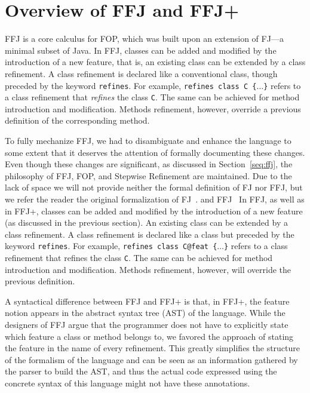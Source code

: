 \chapter{Overview of \gls{FFJ} and \gls{FFJ+}}\label{seq:offj}

\gls{FFJ} is a core calculus for \gls{FOP}, which was built 
upon an extension of \gls{FJ}---a minimal subset of Java. 
In \gls{FFJ}, classes can be added and modified by the 
introduction of a new feature, that is, 
an existing class can be extended by a class refinement. 
A class refinement is declared like a conventional class, though 
preceded by the keyword \texttt{refines}. For example, 
\texttt{refines class C \{$\dots$\}} refers to a class
refinement that
\emph{refines} the class \texttt{C}. The same can be achieved 
for method introduction and modification. Methods refinement,
however, override a previous definition of the corresponding 
method.
 
To fully mechanize \gls{FFJ}, we had to disambiguate and enhance 
the language to some extent that it  deserves the attention of 
formally documenting these changes. 
Even though these changes are significant, as discussed in Section~\ref{seq:ffj}, 
the philosophy of \gls{FFJ}, \gls{FOP}, and Stepwise Refinement are maintained.
Due to the lack of space we will not provide neither the formal definition 
of \gls{FJ} nor \gls{FFJ}, but we refer the reader the original formalization of \gls{FJ}~\cite{igarashi_featherweight_2001}.
 and \gls{FFJ}~\cite{apel_feature_2008}
In \gls{FFJ}, as well as in \gls{FFJ+}, classes can be added and 
modified by the introduction of a new feature (as discussed in the previous section).
An existing class can be extended by a class refinement. A class refinement is declared like a class but
preceded by the keyword \texttt{refines}. For example, \texttt{refines class C@feat \{$\dots$\}} refers to a class refinement that
refines the class \texttt{C}. The same can be achieved for method introduction and modification. Methods refinement,
however, will override the previous definition.

A syntactical difference between \gls{FFJ} and \gls{FFJ+} is that, in \gls{FFJ+}, 
the feature notion appears in the abstract syntax tree (AST) of the language.
While the designers of \gls{FFJ} argue that the programmer does not have 
to explicitly state which feature a class or method belongs to, 
we favored the approach of stating the feature in the name of every refinement.
This greatly simplifies the structure of the formalism of the language and can be 
seen as an information gathered by the parser to build the AST, and thus 
the actual code expressed using the concrete syntax of this language 
might not have these annotations.

